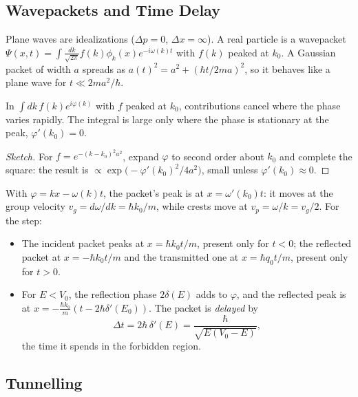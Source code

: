 \subsection{Wavepackets and Time Delay}

Plane waves are idealizations ($\Delta p = 0$, $\Delta x = \infty$). A real particle is a wavepacket $\Psi(x,t) = \int\frac{dk}{\sqrt{2\pi}}f(k)\phi_k(x)e^{-i\omega(k)t}$ with $f(k)$ peaked at $k_0$. A Gaussian packet of width $a$ spreads as $a(t)^2 = a^2 + (\hbar t/2ma)^2$, so it behaves like a plane wave for $t\ll2ma^2/\hbar$.

\begin{theorem}
In $\int dk\,f(k)e^{i\varphi(k)}$ with $f$ peaked at $k_0$, contributions cancel where the phase varies rapidly. The integral is large only where the phase is stationary at the peak, $\varphi'(k_0) = 0$.
\end{theorem}
\begin{proof}[Sketch]
For $f = e^{-(k-k_0)^2a^2}$, expand $\varphi$ to second order about $k_0$ and complete the square: the result is $\propto\exp\bigl(-\varphi'(k_0)^2/4a^2\bigr)$, small unless $\varphi'(k_0)\approx0$.
\end{proof}

With $\varphi = kx-\omega(k)t$, the packet's peak is at $x = \omega'(k_0)t$: it moves at the group velocity $v_g = d\omega/dk = \hbar k_0/m$, while crests move at $v_p = \omega/k = v_g/2$. For the step:
\begin{itemize}
    \item The incident packet peaks at $x = \hbar k_0t/m$, present only for $t<0$; the reflected packet at $x = -\hbar k_0t/m$ and the transmitted one at $x = \hbar q_0t/m$, present only for $t>0$.
    \item For $E<V_0$, the reflection phase $2\delta(E)$ adds to $\varphi$, and the reflected peak is at $x = -\frac{\hbar k_0}{m}(t - 2\hbar\delta'(E_0))$. The packet is \emph{delayed} by
    \[
        \Delta t = 2\hbar\,\delta'(E) = \frac{\hbar}{\sqrt{E(V_0-E)}},
    \]
    the time it spends in the forbidden region.
\end{itemize}

\subsection{Tunnelling}


